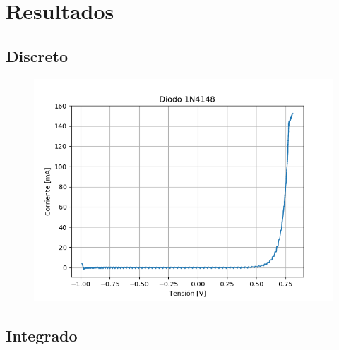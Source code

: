 \documentclass[a4paper,11pt]{article}
\begin{document}
\section{Resultados}

	\subsection{Discreto}
	
	\begin{figure}[h]
		\centering
		\includegraphics[width=\textwidth]{imagenes/Diodo1N4148.png}
		\caption{}
	\end{figure}
	
	\subsection{Integrado}
	
\end{document}
